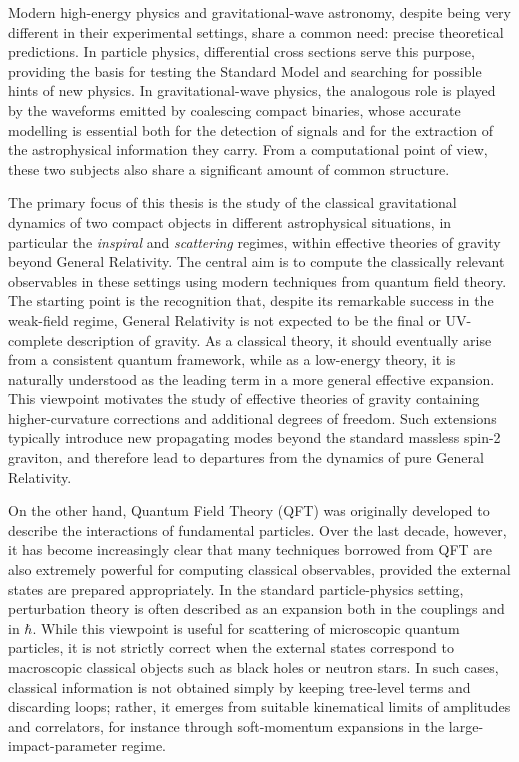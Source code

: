 Modern high-energy physics and gravitational-wave astronomy, despite being very different in their experimental settings, share a common need: precise theoretical predictions. In particle physics, differential cross sections serve this purpose, providing the basis for testing the Standard Model and searching for possible hints of new physics. In gravitational-wave physics, the analogous role is played by the waveforms emitted by coalescing compact binaries, whose accurate modelling is essential both for the detection of signals and for the extraction of the astrophysical information they carry. From a computational point of view, these two subjects also share a significant amount of common structure.

The primary focus of this thesis is the study of the classical gravitational dynamics of two compact objects in different astrophysical situations, in particular the \textit{inspiral} and \textit{scattering} regimes, within effective theories of gravity beyond General Relativity. The central aim is to compute the classically relevant observables in these settings using modern techniques from quantum field theory. The starting point is the recognition that, despite its remarkable success in the weak-field regime, General Relativity is not expected to be the final or UV-complete description of gravity. As a classical theory, it should eventually arise from a consistent quantum framework, while as a low-energy theory, it is naturally understood as the leading term in a more general effective expansion. This viewpoint motivates the study of effective theories of gravity containing higher-curvature corrections and additional degrees of freedom. Such extensions typically introduce new propagating modes beyond the standard massless spin-2 graviton, and therefore lead to departures from the dynamics of pure General Relativity.

On the other hand, Quantum Field Theory (QFT) was originally developed to describe the interactions of fundamental particles. Over the last decade, however, it has become increasingly clear that many techniques borrowed from QFT are also extremely powerful for computing classical observables, provided the external states are prepared appropriately. In the standard particle-physics setting, perturbation theory is often described as an expansion both in the couplings and in $\hbar$. While this viewpoint is useful for scattering of microscopic quantum particles, it is not strictly correct when the external states correspond to macroscopic classical objects such as black holes or neutron stars. In such cases, classical information is not obtained simply by keeping tree-level terms and discarding loops; rather, it emerges from suitable kinematical limits of amplitudes and correlators, for instance through soft-momentum expansions in the large-impact-parameter regime.


